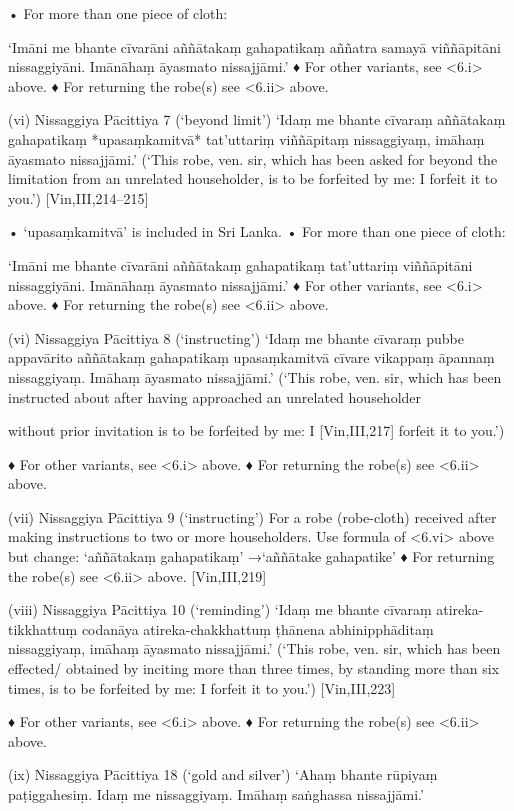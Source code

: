 • For more than one piece of cloth:

‘Imāni me bhante cīvarāni aññātakaṃ
gahapatikaṃ aññatra samayā viññāpitāni
nissaggiyāni. Imānāhaṃ āyasmato nissajjāmi.’
♦ For other variants, see <6.i> above.
♦ For returning the robe(s) see <6.ii> above.

(vi) Nissaggiya Pācittiya 7 (‘beyond limit’)
‘Idaṃ me bhante cīvaraṃ aññātakaṃ
gahapatikaṃ *upasaṃkamitvā* tat'uttariṃ
viññāpitaṃ nissaggiyaṃ,
imāhaṃ āyasmato nissajjāmi.’
(‘This robe, ven. sir, which has been asked for beyond
the limitation from an unrelated householder, is to be
forfeited by me: I forfeit it to you.’)
[Vin,III,214–215]

• ‘upasaṃkamitvā’ is included in Sri Lanka.
• For more than one piece of cloth:

‘Imāni me bhante cīvarāni aññātakaṃ
gahapatikaṃ tat'uttariṃ viññāpitāni
nissaggiyāni. Imānāhaṃ āyasmato nissajjāmi.’
♦ For other variants, see <6.i> above.
♦ For returning the robe(s) see <6.ii> above.

(vi) Nissaggiya Pācittiya 8 (‘instructing’)
‘Idaṃ me bhante cīvaraṃ pubbe appavārito
aññātakaṃ gahapatikaṃ upasaṃkamitvā
cīvare vikappaṃ āpannaṃ nissaggiyaṃ.
Imāhaṃ āyasmato nissajjāmi.’
(‘This robe, ven. sir, which has been instructed about
after having approached an unrelated householder

without prior invitation is to be forfeited by me: I
[Vin,III,217]
forfeit it to you.’)

♦ For other variants, see <6.i> above.
♦ For returning the robe(s) see <6.ii> above.

(vii) Nissaggiya Pācittiya 9 (‘instructing’)
For a robe (robe-cloth) received after making
instructions to two or more householders. Use
formula of <6.vi> above but change:
‘aññātakaṃ gahapatikaṃ’
→‘aññātake gahapatike’
♦ For returning the robe(s) see <6.ii> above.
[Vin,III,219]

(viii) Nissaggiya Pācittiya 10 (‘reminding’)
‘Idaṃ me bhante cīvaraṃ atireka-tikkhattuṃ
codanāya atireka-chakkhattuṃ ṭhānena
abhinipphāditaṃ nissaggiyaṃ,
imāhaṃ āyasmato nissajjāmi.’
(‘This robe, ven. sir, which has been effected/
obtained by inciting more than three times, by
standing more than six times, is to be forfeited
by me: I forfeit it to you.’)
[Vin,III,223]

♦ For other variants, see <6.i> above.
♦ For returning the robe(s) see <6.ii> above.

(ix) Nissaggiya Pācittiya 18 (‘gold and silver’)
‘Ahaṃ bhante rūpiyaṃ paṭiggahesiṃ.
Idaṃ me nissaggiyaṃ.
Imāhaṃ saṅghassa nissajjāmi.’

